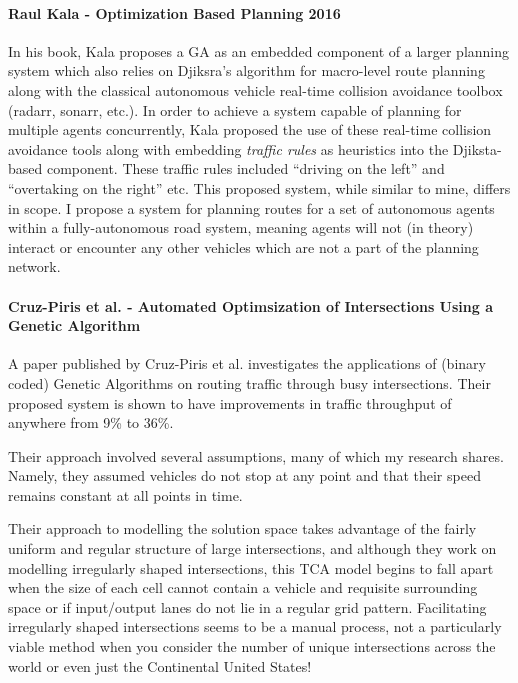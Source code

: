 \paragraph{Raul Kala - Optimization Based Planning 2016\cite{kalaOptimizationBasedPlanning2016}}
In his book, Kala proposes a GA as an embedded component of a larger planning system which also relies on Djiksra's algorithm for macro-level route planning along with the classical autonomous vehicle real-time collision avoidance toolbox (radarr, sonarr, etc.). In order to achieve a system capable of planning for multiple agents concurrently, Kala proposed the use of these real-time collision avoidance tools along with embedding \textit{traffic rules} as heuristics into the Djiksta-based component. These traffic rules included ``driving on the left'' and ``overtaking on the right'' etc. This proposed system, while similar to mine, differs in scope. I propose a system for planning routes for a set of autonomous agents within a fully-autonomous road system, meaning agents will not (in theory) interact or encounter any other vehicles which are not a part of the planning network.

\paragraph{Cruz-Piris et al. - Automated Optimsization of Intersections Using a Genetic Algorithm\cite{cruz-pirisAutomatedOptimizationIntersections2019}}
A paper published by Cruz-Piris et al. investigates the applications of (binary coded) Genetic Algorithms on routing traffic through busy intersections. Their proposed system is shown to have improvements in traffic throughput of anywhere from 9\% to 36\%.

Their approach involved several assumptions, many of which my research shares. Namely, they assumed vehicles do not stop at any point and that their speed remains constant at all points in time.

Their approach to modelling the solution space takes advantage of the fairly uniform and regular structure of large intersections, and although they work on modelling irregularly shaped intersections, this TCA model begins to fall apart when the size of each cell cannot contain a vehicle and requisite surrounding space or if input/output lanes do not lie in a regular grid pattern. Facilitating irregularly shaped intersections seems to be a manual process, not a particularly viable method when you consider the number of unique intersections across the world or even just the Continental United States!

